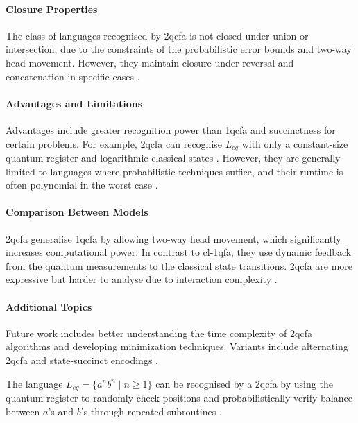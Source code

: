 \paragraph{Closure Properties}  
The class of languages recognised by \gls{2qcfa} is not closed under union or intersection, due to the constraints of the probabilistic error bounds and two-way head movement. However, they maintain closure under reversal and concatenation in specific cases \cite{li2015hybrid}.

\paragraph{Advantages and Limitations}  
Advantages include greater recognition power than \gls{1qcfa} and succinctness for certain problems. For example, \gls{2qcfa} can recognise $L_{eq}$ with only a constant-size quantum register and logarithmic classical states \cite{remscrim2020power}. However, they are generally limited to languages where probabilistic techniques suffice, and their runtime is often polynomial in the worst case \cite{remscrim2020lower}.

\paragraph{Comparison Between Models}  
\gls{2qcfa} generalise \gls{1qcfa} by allowing two-way head movement, which significantly increases computational power. In contrast to \gls{cl-1qfa}, they use dynamic feedback from the quantum measurements to the classical state transitions. \gls{2qcfa} are more expressive but harder to analyse due to interaction complexity \cite{zheng2013state}.

\paragraph{Additional Topics}  
Future work includes better understanding the time complexity of \gls{2qcfa} algorithms and developing minimization techniques. Variants include alternating \gls{2qcfa} and state-succinct encodings \cite{zheng2013state, remscrim2020lower}.

\begin{example}
The language $L_{eq} = \{ a^n b^n \mid n \geq 1 \}$ can be recognised by a \gls{2qcfa} by using the quantum register to randomly check positions and probabilistically verify balance between $a$'s and $b$'s through repeated subroutines \cite{ambainis2002two}.
\end{example}

